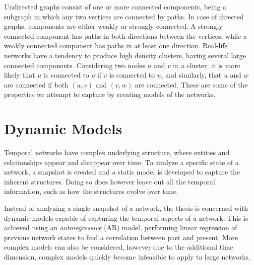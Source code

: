     Undirected graphs consist of one or more connected components, being a subgraph in which any two vertices are connected by paths. 
    In case of directed graphs, components are either weakly or strongly connected. A strongly connected component has paths in both directions between the vertices, while a weakly connected component has paths in at least one direction. 
    Real-life networks have a tendency to produce high density clusters, having several large connected components. 
    Considering two nodes $u$ and $v$ in a cluster, it is more likely that $u$ is connected to $v$ if $v$ is connected to $u$, and similarly, that $u$ and $w$ are connected if both $(u,v)$ and $(v,w)$ are connected. These are some of the properties we attempt to capture by creating models of the networks.

\section{Dynamic Models}

    Temporal networks have complex underlying structure, where entities and relationships appear and disappear over time. To analyze a specific state of a network, a snapshot is created and a static model is developed to capture the inherent structures.
    Doing so does however leave out all the temporal information, such as how the structures evolve over time.
    
    Instead of analyzing a single snapshot of a network, the thesis is concerned with dynamic models capable of capturing the temporal aspects of a network. This is achieved using an \emph{autoregressive} (AR) model, performing linear regression of previous network states to find a correlation between past and present. More complex models can also be considered, however due to the additional time dimension, complex models quickly become infeasible to apply to large networks.
    
